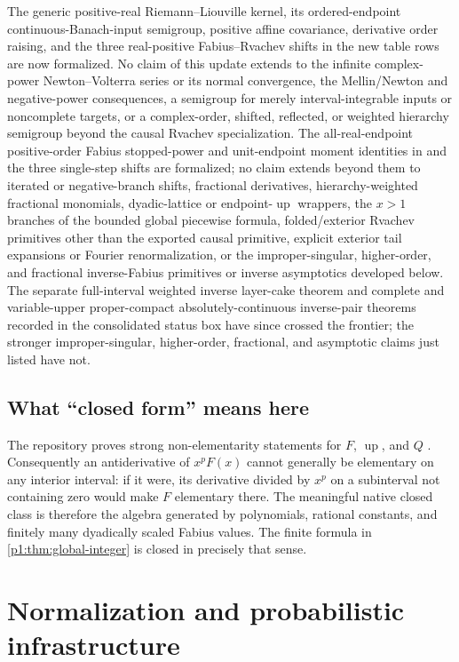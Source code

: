 \documentclass[11pt,oneside]{article}
\theoremstyle{definition}
\theoremstyle{remark}
\newcommand{\Up}{\operatorname{up}}
\newcommand{\1}{\mathbf 1}
\begin{document}
The generic positive-real Riemann--Liouville kernel, its ordered-endpoint
continuous-Banach-input semigroup, positive affine covariance, derivative order raising, and
the three real-positive Fabius--Rvachev shifts in the new table rows are now formalized.  No
claim of this update extends to the infinite complex-power
Newton--Volterra series or its normal convergence, the Mellin/Newton and
negative-power consequences, a semigroup for merely interval-integrable inputs or
noncomplete targets, or a complex-order, shifted, reflected, or weighted hierarchy
semigroup beyond the causal Rvachev specialization.  The
all-real-endpoint positive-order Fabius stopped-power and unit-endpoint moment identities in
 and the three single-step shifts are formalized; no
claim extends beyond them to iterated or negative-branch shifts, fractional derivatives,
hierarchy-weighted fractional monomials, dyadic-lattice or endpoint-\(\Up\) wrappers, the
\(x>1\) branches of the bounded global piecewise formula, folded/exterior Rvachev primitives
other than the exported causal primitive, explicit exterior tail expansions or Fourier
renormalization, or the
improper-singular, higher-order, and fractional inverse-Fabius primitives or inverse
asymptotics developed below.  The separate full-interval weighted inverse layer-cake
theorem and complete and variable-upper proper-compact absolutely-continuous inverse-pair
theorems recorded in the consolidated status box have since crossed the frontier; the
stronger improper-singular, higher-order, fractional, and asymptotic claims just listed
have not.

\subsection{What ``closed form'' means here}
The repository proves strong non-elementarity statements for \(F\), \(\Up\),
and \(Q\) \cite{p1:ProveItNonElementary,p1:ProveItFrontiers}.  Consequently an
antiderivative of \(x^pF(x)\) cannot generally be elementary on any interior
interval: if it were, its derivative divided by \(x^p\) on a subinterval not
containing zero would make \(F\) elementary there.  The meaningful native
closed class is therefore the algebra generated by polynomials, rational
constants, and finitely many dyadically scaled Fabius values.  The finite
formula in \cref{p1:thm:global-integer} is closed in precisely that sense.

\section{Normalization and probabilistic infrastructure}
\end{document}
